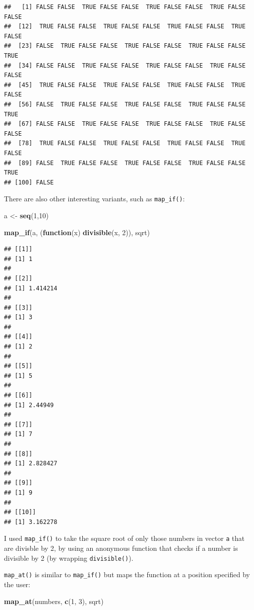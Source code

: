 \documentclass[]{gitbook}
\newenvironment{Shaded}{\begin{snugshade}}{\end{snugshade}}
\newcommand{\ControlFlowTok}[1]{\textcolor[rgb]{0.13,0.29,0.53}{\textbf{#1}}}
\newcommand{\DecValTok}[1]{\textcolor[rgb]{0.00,0.00,0.81}{#1}}
\newcommand{\KeywordTok}[1]{\textcolor[rgb]{0.13,0.29,0.53}{\textbf{#1}}}
\newcommand{\NormalTok}[1]{#1}
\newcommand{\StringTok}[1]{\textcolor[rgb]{0.31,0.60,0.02}{#1}}
\theoremstyle{definition}
\theoremstyle{definition}
\theoremstyle{definition}
\theoremstyle{remark}
\begin{document}
\begin{verbatim}
##   [1] FALSE FALSE  TRUE FALSE FALSE  TRUE FALSE FALSE  TRUE FALSE FALSE
##  [12]  TRUE FALSE FALSE  TRUE FALSE FALSE  TRUE FALSE FALSE  TRUE FALSE
##  [23] FALSE  TRUE FALSE FALSE  TRUE FALSE FALSE  TRUE FALSE FALSE  TRUE
##  [34] FALSE FALSE  TRUE FALSE FALSE  TRUE FALSE FALSE  TRUE FALSE FALSE
##  [45]  TRUE FALSE FALSE  TRUE FALSE FALSE  TRUE FALSE FALSE  TRUE FALSE
##  [56] FALSE  TRUE FALSE FALSE  TRUE FALSE FALSE  TRUE FALSE FALSE  TRUE
##  [67] FALSE FALSE  TRUE FALSE FALSE  TRUE FALSE FALSE  TRUE FALSE FALSE
##  [78]  TRUE FALSE FALSE  TRUE FALSE FALSE  TRUE FALSE FALSE  TRUE FALSE
##  [89] FALSE  TRUE FALSE FALSE  TRUE FALSE FALSE  TRUE FALSE FALSE  TRUE
## [100] FALSE
\end{verbatim}

There are also other interesting variants, such as \texttt{map\_if()}:

\begin{Shaded}
\begin{Highlighting}[]
\NormalTok{a <-}\StringTok{ }\KeywordTok{seq}\NormalTok{(}\DecValTok{1}\NormalTok{,}\DecValTok{10}\NormalTok{)}

\KeywordTok{map_if}\NormalTok{(a, (}\ControlFlowTok{function}\NormalTok{(x) }\KeywordTok{divisible}\NormalTok{(x, }\DecValTok{2}\NormalTok{)), sqrt)}
\end{Highlighting}
\end{Shaded}

\begin{verbatim}
## [[1]]
## [1] 1
## 
## [[2]]
## [1] 1.414214
## 
## [[3]]
## [1] 3
## 
## [[4]]
## [1] 2
## 
## [[5]]
## [1] 5
## 
## [[6]]
## [1] 2.44949
## 
## [[7]]
## [1] 7
## 
## [[8]]
## [1] 2.828427
## 
## [[9]]
## [1] 9
## 
## [[10]]
## [1] 3.162278
\end{verbatim}

I used \texttt{map\_if()} to take the square root of only those numbers
in vector \texttt{a} that are divisble by 2, by using an anonymous
function that checks if a number is divisible by 2 (by wrapping
\texttt{divisible()}).

\texttt{map\_at()} is similar to \texttt{map\_if()} but maps the
function at a position specified by the user:

\begin{Shaded}
\begin{Highlighting}[]
\KeywordTok{map_at}\NormalTok{(numbers, }\KeywordTok{c}\NormalTok{(}\DecValTok{1}\NormalTok{, }\DecValTok{3}\NormalTok{), sqrt)}
\end{Highlighting}
\end{Shaded}
\end{document}
